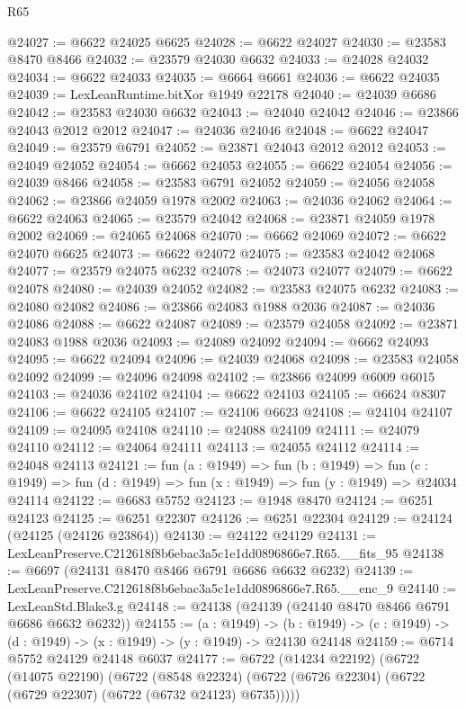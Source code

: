 \begin{lexlean}{R65}
\begin{coremodule}
{@24027 := @6622 @24025 @6625
@24028 := @6622 @24027
@24030 := @23583 @8470 @8466
@24032 := @23579 @24030 @6632
@24033 := @24028 @24032
@24034 := @6622 @24033
@24035 := @6664 @6661
@24036 := @6622 @24035
@24039 := LexLeanRuntime.bitXor @1949 @22178
@24040 := @24039 @6686
@24042 := @23583 @24030 @6632
@24043 := @24040 @24042
@24046 := @23866 @24043 @2012 @2012
@24047 := @24036 @24046
@24048 := @6622 @24047
@24049 := @23579 @6791
@24052 := @23871 @24043 @2012 @2012
@24053 := @24049 @24052
@24054 := @6662 @24053
@24055 := @6622 @24054
@24056 := @24039 @8466
@24058 := @23583 @6791 @24052
@24059 := @24056 @24058
@24062 := @23866 @24059 @1978 @2002
@24063 := @24036 @24062
@24064 := @6622 @24063
@24065 := @23579 @24042
@24068 := @23871 @24059 @1978 @2002
@24069 := @24065 @24068
@24070 := @6662 @24069
@24072 := @6622 @24070 @6625
@24073 := @6622 @24072
@24075 := @23583 @24042 @24068
@24077 := @23579 @24075 @6232
@24078 := @24073 @24077
@24079 := @6622 @24078
@24080 := @24039 @24052
@24082 := @23583 @24075 @6232
@24083 := @24080 @24082
@24086 := @23866 @24083 @1988 @2036
@24087 := @24036 @24086
@24088 := @6622 @24087
@24089 := @23579 @24058
@24092 := @23871 @24083 @1988 @2036
@24093 := @24089 @24092
@24094 := @6662 @24093
@24095 := @6622 @24094
@24096 := @24039 @24068
@24098 := @23583 @24058 @24092
@24099 := @24096 @24098
@24102 := @23866 @24099 @6009 @6015
@24103 := @24036 @24102
@24104 := @6622 @24103
@24105 := @6624 @8307
@24106 := @6622 @24105
@24107 := @24106 @6623
@24108 := @24104 @24107
@24109 := @24095 @24108
@24110 := @24088 @24109
@24111 := @24079 @24110
@24112 := @24064 @24111
@24113 := @24055 @24112
@24114 := @24048 @24113
@24121 := fun (a : @1949) =>
  fun (b : @1949) =>
  fun (c : @1949) => fun (d : @1949) => fun (x : @1949) => fun (y : @1949) => @24034 @24114
@24122 := @6683 @5752
@24123 := @1948 @8470
@24124 := @6251 @24123
@24125 := @6251 @22307
@24126 := @6251 @22304
@24129 := @24124 (@24125 (@24126 @23864))
@24130 := @24122 @24129
@24131 := LexLeanPreserve.C212618f8b6ebac3a5c1e1dd0896866e7.R65.__fits_95
@24138 := @6697 (@24131 @8470 @8466 @6791 @6686 @6632 @6232)
@24139 := LexLeanPreserve.C212618f8b6ebac3a5c1e1dd0896866e7.R65.__enc_9
@24140 := LexLeanStd.Blake3.g
@24148 := @24138 (@24139 (@24140 @8470 @8466 @6791 @6686 @6632 @6232))
@24155 := (a : @1949) ->
  (b : @1949) -> (c : @1949) -> (d : @1949) -> (x : @1949) -> (y : @1949) -> @24130 @24148
@24159 := @6714 @5752 @24129 @24148 @6037
@24177 := @6722
    (@14234 @22192)
    (@6722
      (@14075 @22190)
      (@6722
        (@8548 @22324)
        (@6722 (@6726 @22304) (@6722 (@6729 @22307) (@6722 (@6732 @24123) @6735)))))
}
\end{coremodule}
\end{lexlean}
